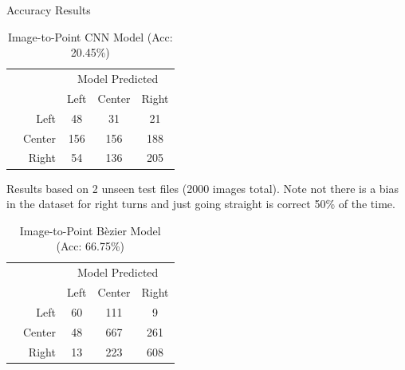 \documentclass[aspectratio=169,xcolor=dvipsnames]{beamer}
\begin{document}
\begin{frame}{Accuracy Results}
    \begin{multicols}{2}
    
    \begin{table}[h]
        \centering
            \caption{Image-to-Point CNN Model (Acc: 20.45\%)}
            \begin{tabular}{|c|r|c|c|c|}
            \multicolumn{2}{c}{} & \multicolumn{3}{c}{Model Predicted}\\\cline{3-5}
            \multicolumn{1}{c}{} & & Left & Center & Right\\\hline
             \parbox[t]{2mm}{} & Left & 48 & 31 & 21 \\
            & Center & 156 & 156 & 188 \\
            & Right & 54 & 136 & 205 \\\hline
            \end{tabular}
        \label{tab:i2p-acc}
    \end{table}
    
    Results based on 2 unseen test files (2000 images total). Note not there is a bias in the dataset for right turns and just going straight is correct 50\% of the time.
    
    \columnbreak
    \begin{table}[h]
        \centering
            \caption{Image-to-Point B\`ezier Model (Acc: 66.75\%)}
            \begin{tabular}{|c|r|c|c|c|}
            \multicolumn{2}{c}{} & \multicolumn{3}{c}{Model Predicted}\\\cline{3-5}
            \multicolumn{1}{c}{} & & Left & Center & Right\\\hline
             \parbox[t]{2mm}{} & Left & 60 & 111 & 9 \\
            & Center & 48 & 667 & 261 \\
            & Right & 13 & 223 & 608 \\\hline
            \end{tabular}
        \label{tab:i2bp-acc}
    \end{table}
    

\end{multicols}
\end{frame}
\end{document}
